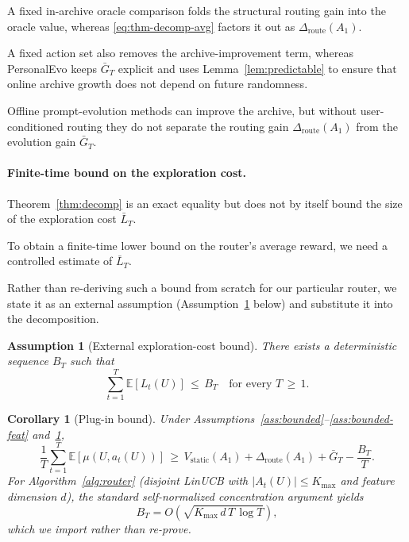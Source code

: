 \documentclass{article} %
\newtheorem{corollary}[theorem]{Corollary}
\newtheorem{assumption}{Assumption}
\providecommand{\E}{\mathbb{E}}
\begin{document}
A fixed in-archive oracle comparison folds the structural routing gain into the oracle value, whereas \eqref{eq:thm-decomp-avg} factors it out as $\Delta_{\mathrm{route}}(A_1)$.

A fixed action set also removes the archive-improvement term, whereas PersonalEvo keeps $\bar G_T$ explicit and uses Lemma~\ref{lem:predictable} to ensure that online archive growth does not depend on future randomness.

Offline prompt-evolution methods can improve the archive, but without user-conditioned routing they do not separate the routing gain $\Delta_{\mathrm{route}}(A_1)$ from the evolution gain $\bar G_T$.

\paragraph{Finite-time bound on the exploration cost.}

\label{sec:method-plugin}

Theorem~\ref{thm:decomp} is an exact equality but does not by itself bound the size of the exploration cost $\bar L_T$.

To obtain a finite-time lower bound on the router's average reward, we need a controlled estimate of $\bar L_T$.

Rather than re-deriving such a bound from scratch for our particular router, we state it as an external assumption (Assumption~\ref{ass:Bt} below) and substitute it into the decomposition.

\begin{assumption}[External exploration-cost bound]
\label{ass:Bt}
There exists a deterministic sequence $B_T$ such that
\begin{equation}
\label{eq:ass-Bt}
\sum_{t=1}^T \E[L_t(U)] \,\le\, B_T \quad \text{for every } T \,\ge\, 1.
\end{equation}
\end{assumption}

\begin{corollary}[Plug-in bound]
\label{cor:plugin}
Under Assumptions~\ref{ass:bounded}--\ref{ass:bounded-feat} and~\ref{ass:Bt},
\begin{equation}
\label{eq:cor-plugin}
\frac{1}{T}\sum_{t=1}^T \E[\mu(U, a_t(U))]
\,\ge\, V_{\mathrm{static}}(A_1) + \Delta_{\mathrm{route}}(A_1) + \bar G_T - \frac{B_T}{T}.
\end{equation}
For Algorithm~\ref{alg:router} (disjoint LinUCB with $|A_t(U)| \le K_{\max}$ and feature dimension $d$), the standard self-normalized concentration argument \citep{abbasi2011oful,chu2011linucb} yields
\begin{equation}
\label{eq:cor-plugin-rate}
B_T = O\!\left(\sqrt{K_{\max} \, d \, T \, \log T}\right),
\end{equation}
which we import rather than re-prove.
\end{corollary}
\end{document}
